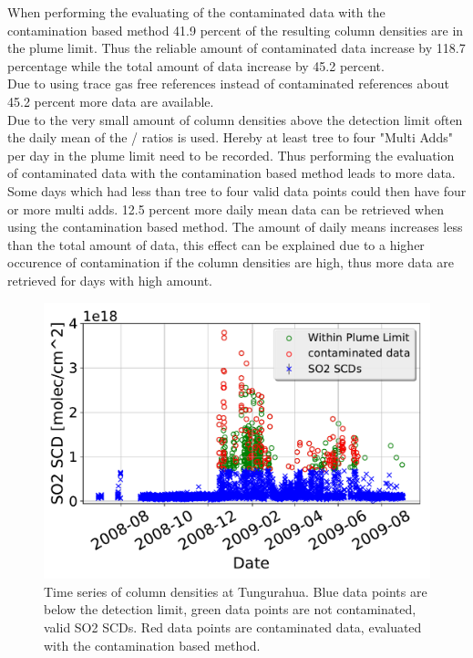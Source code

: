 \documentclass  [
  paper    = a4,
  BCOR     = 10mm,
  twoside,
  fontsize = 12pt,
  fleqn,
  toc      = bibnumbered,
  toc      = listofnumbered,
  numbers  = noendperiod,
  headings = normal,
  listof   = leveldown,
  version  = 3.03
]                                       {scrreprt}
\begin{document}
 	When performing the evaluating of the contaminated data with the contamination based method 41.9 percent of the resulting   column densities are in the plume limit. Thus the reliable amount of contaminated data increase by 118.7 percentage while the total amount of data increase by 45.2 percent.\\
 	Due to using trace gas free references instead of contaminated references about 45.2 percent more data are available. \\
 	Due to the very small amount of   column densities above the detection limit often the daily mean of the /  ratios is used. Hereby at least tree to four "Multi Adds" per day in the plume limit need to be recorded. Thus performing the evaluation of contaminated data with the contamination based method leads to more data. Some days which had less than  tree to four valid data points could then have four or more multi adds. 12.5 percent more daily mean data can be retrieved when using the contamination based method. The amount of daily means increases less than the total amount of data, this effect can be explained due to a higher occurence of contamination if the   column densities are high, thus more data are retrieved for days with high   amount.
	\begin{figure}
		\centering
		\includegraphics[width=0.7\linewidth]{Bilder/tung_so2_novac_sametime}
		\caption{Time series of  column densities at Tungurahua. Blue data points are below the detection limit, green data points are not contaminated, valid SO2 SCDs. Red data points are contaminated data, evaluated with the contamination based method.}
		\label{fig:tungso2novacsametime}
	\end{figure}
	
\end{document}
